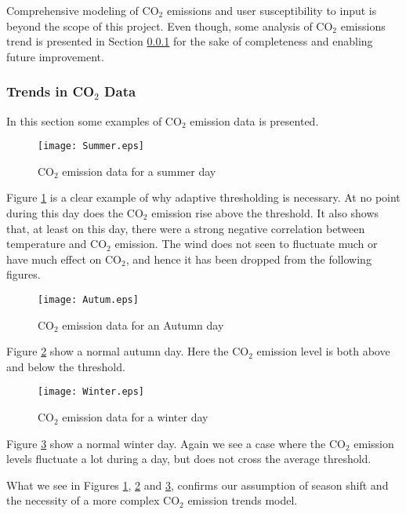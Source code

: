 \documentclass[Main]{subfiles}
\begin{document}
		Comprehensive modeling of CO$_2$ emissions and user susceptibility to input is beyond the scope of this project.
		Even though, some analysis of CO$_2$ emissions trend is presented in Section \ref{sub:trends_in_co2_data} for the sake of completeness and enabling future improvement.



	\subsubsection{Trends in CO$_2$ Data} %
	\label{sub:trends_in_co2_data}
		
		In this section some examples of CO$_2$ emission data is presented.

		\begin{figure}[H]
			\centering 
			\texttt{[image: Summer.eps]}
			\caption{CO$_2$ emission data for a summer day}
			\label{fig:Summer}
		\end{figure}

		Figure \ref{fig:Summer} is a clear example of why adaptive thresholding is necessary.
		At no point during this day does the CO$_2$ emission rise above the threshold.
		It also shows that, at least on this day, there were a strong negative correlation between temperature and CO$_2$ emission.
		The wind does not seen to fluctuate much or have much effect on CO$_2$, and hence it has been dropped from the following figures.


		\begin{figure}[H]
			\centering
			\texttt{[image: Autum.eps]}
			\caption{CO$_2$ emission data for an Autumn day}
			\label{fig:Autum}
		\end{figure}

		Figure \ref{fig:Autum} show a normal autumn day. Here the CO$_2$ emission level is both above and below the threshold.


		\begin{figure}[H]
			\centering
			\texttt{[image: Winter.eps]}
			\caption{CO$_2$ emission data for a winter day}
			\label{fig:Winter}
		\end{figure}
	

		Figure \ref{fig:Winter} show a normal winter day.
		Again we see a case where the CO$_2$ emission levels fluctuate a lot during a day, but does not cross the average threshold.

		What we see in Figures \ref{fig:Summer}, \ref{fig:Autum} and \ref{fig:Winter}, confirms our assumption of season shift and the necessity of a more complex CO$_2$ emission trends model.
		
\end{document}
